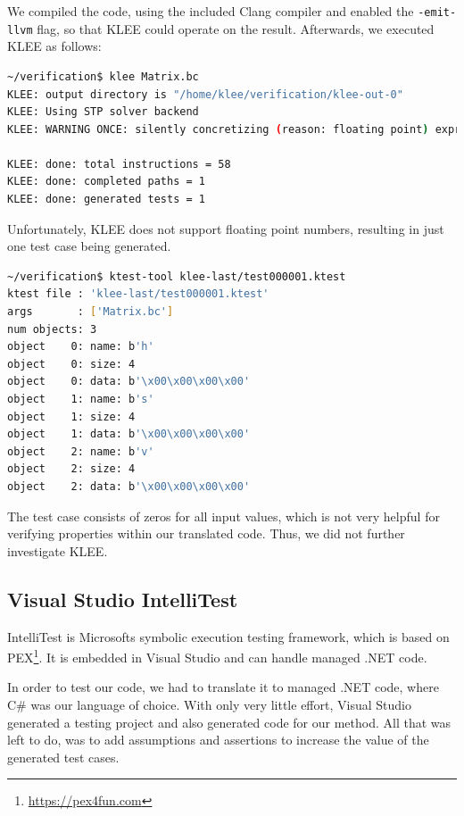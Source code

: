 \documentclass{scrreprt}
\begin{document}
We compiled the code, using the included Clang compiler and enabled the \texttt{-emit-llvm} flag, so that KLEE could operate on the result.
Afterwards, we executed KLEE as follows:

\bigskip
\begin{lstlisting}[language=bash, numbers=none, frame=single]
~/verification$ klee Matrix.bc
KLEE: output directory is "/home/klee/verification/klee-out-0"
KLEE: Using STP solver backend
KLEE: WARNING ONCE: silently concretizing (reason: floating point) expression (ReadLSB w32 0 s) to value 0 (/home/klee/verification/Matrix.c:24)

KLEE: done: total instructions = 58
KLEE: done: completed paths = 1
KLEE: done: generated tests = 1
\end{lstlisting}
\bigskip

Unfortunately, KLEE does not support floating point numbers, resulting in just one test case being generated.

\bigskip
\begin{lstlisting}[language=bash, numbers=none, frame=single]
~/verification$ ktest-tool klee-last/test000001.ktest
ktest file : 'klee-last/test000001.ktest'
args       : ['Matrix.bc']
num objects: 3
object    0: name: b'h'
object    0: size: 4
object    0: data: b'\x00\x00\x00\x00'
object    1: name: b's'
object    1: size: 4
object    1: data: b'\x00\x00\x00\x00'
object    2: name: b'v'
object    2: size: 4
object    2: data: b'\x00\x00\x00\x00'
\end{lstlisting}
\bigskip

The test case consists of zeros for all input values, which is not very helpful for verifying properties within our translated code. Thus, we did not further investigate KLEE.

\subsection{Visual Studio IntelliTest}

IntelliTest is Microsofts symbolic execution testing framework, which is based on PEX\footnote{\url{https://pex4fun.com}}. It is embedded in Visual Studio and can handle managed .NET code.

In order to test our code, we had to translate it to managed .NET code, where C\# was our language of choice. With only very little effort, Visual Studio generated a testing project and also generated code for our method. All that was left to do, was to add assumptions and assertions to increase the value of the generated test cases.
\end{document}
